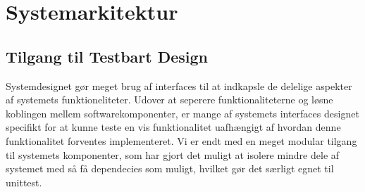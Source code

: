 \section{Systemarkitektur}


\subsection{Tilgang til Testbart Design}

Systemdesignet gør meget brug af interfaces til at indkapsle de delelige aspekter af systemets funktioneliteter. 
Udover at seperere funktionaliteterne og løsne koblingen mellem softwarekomponenter, er mange af systemets interfaces designet specifikt for at kunne teste en vis funktionalitet uafhængigt af hvordan denne funktionalitet forventes implementeret.
Vi er endt med en meget modular tilgang til systemets komponenter, som har gjort det muligt at isolere mindre dele af systemet med så få dependecies som muligt, hvilket gør det særligt egnet til unittest.
